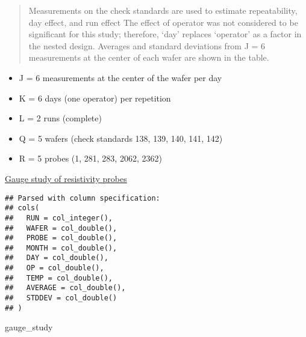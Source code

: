 \documentclass[]{book}
\newenvironment{Shaded}{\begin{snugshade}}{\end{snugshade}}
\newcommand{\DataTypeTok}[1]{\textcolor[rgb]{0.13,0.29,0.53}{#1}}
\newcommand{\KeywordTok}[1]{\textcolor[rgb]{0.13,0.29,0.53}{\textbf{#1}}}
\newcommand{\NormalTok}[1]{#1}
\newcommand{\OperatorTok}[1]{\textcolor[rgb]{0.81,0.36,0.00}{\textbf{#1}}}
\newcommand{\OtherTok}[1]{\textcolor[rgb]{0.56,0.35,0.01}{#1}}
\newcommand{\StringTok}[1]{\textcolor[rgb]{0.31,0.60,0.02}{#1}}
\providecommand{\tightlist}{%
  \setlength{\itemsep}{0pt}\setlength{\parskip}{0pt}}
\theoremstyle{definition}
\theoremstyle{definition}
\theoremstyle{definition}
\theoremstyle{remark}
\begin{document}
\begin{quote}
Measurements on the check standards are used to estimate repeatability,
day effect, and run effect The effect of operator was not considered to
be significant for this study; therefore, `day' replaces `operator' as a
factor in the nested design. Averages and standard deviations from J = 6
measurements at the center of each wafer are shown in the table.
\end{quote}

\begin{itemize}
\tightlist
\item
  J = 6 measurements at the center of the wafer per day
\item
  K = 6 days (one operator) per repetition
\item
  L = 2 runs (complete)
\item
  Q = 5 wafers (check standards 138, 139, 140, 141, 142)
\item
  R = 5 probes (1, 281, 283, 2062, 2362)
\end{itemize}

\href{https://www.itl.nist.gov/div898/handbook/mpc/section6/mpc61.htm}{Gauge
study of resistivity probes}

\begin{Shaded}
\end{Shaded}

\begin{verbatim}
## Parsed with column specification:
## cols(
##   RUN = col_integer(),
##   WAFER = col_double(),
##   PROBE = col_double(),
##   MONTH = col_double(),
##   DAY = col_double(),
##   OP = col_double(),
##   TEMP = col_double(),
##   AVERAGE = col_double(),
##   STDDEV = col_double()
## )
\end{verbatim}

\begin{Shaded}
\begin{Highlighting}[]
\NormalTok{gauge_study}
\end{Highlighting}
\end{Shaded}
\end{document}

